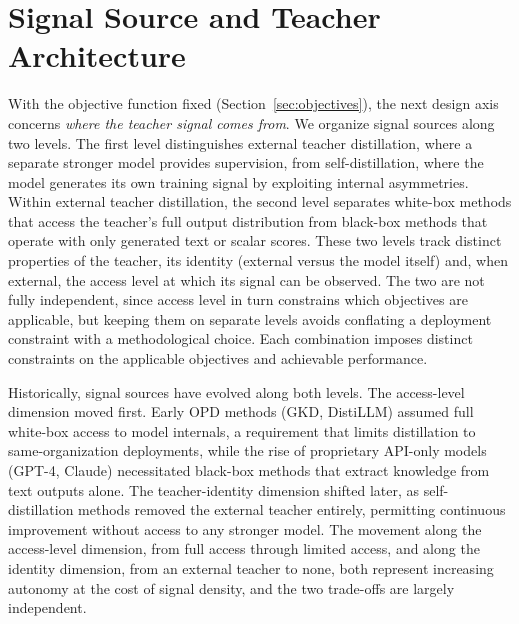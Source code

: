 \documentclass{article} %
\begin{document}
\section{Signal Source and Teacher Architecture}
\label{sec:signal}

With the objective function fixed (Section~\ref{sec:objectives}), the next design axis concerns \emph{where the teacher signal comes from}. We organize signal sources along two levels. The first level distinguishes external teacher distillation, where a separate stronger model provides supervision, from self-distillation, where the model generates its own training signal by exploiting internal asymmetries. Within external teacher distillation, the second level separates white-box methods that access the teacher's full output distribution from black-box methods that operate with only generated text or scalar scores. These two levels track distinct properties of the teacher, its identity (external versus the model itself) and, when external, the access level at which its signal can be observed. The two are not fully independent, since access level in turn constrains which objectives are applicable, but keeping them on separate levels avoids conflating a deployment constraint with a methodological choice. Each combination imposes distinct constraints on the applicable objectives and achievable performance.

Historically, signal sources have evolved along both levels. The access-level dimension moved first. Early OPD methods (GKD, DistiLLM) assumed full white-box access to model internals, a requirement that limits distillation to same-organization deployments, while the rise of proprietary API-only models (GPT-4, Claude) necessitated black-box methods that extract knowledge from text outputs alone. The teacher-identity dimension shifted later, as self-distillation methods removed the external teacher entirely, permitting continuous improvement without access to any stronger model. The movement along the access-level dimension, from full access through limited access, and along the identity dimension, from an external teacher to none, both represent increasing autonomy at the cost of signal density, and the two trade-offs are largely independent.
\end{document}
